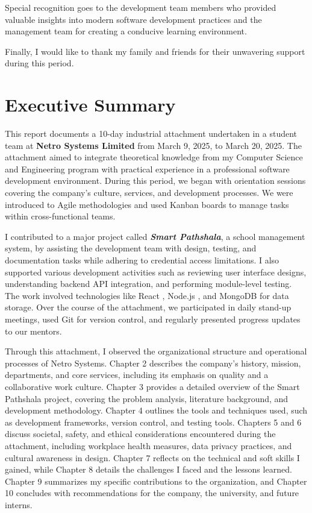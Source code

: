\documentclass[12pt,a4paper]{report}
\let\oldcite\cite
\renewcommand{\cite}[1]{\textcolor{impactcolor}{\oldcite{#1}}}
\begin{document}
Special recognition goes to the development team members who provided valuable insights into modern software development practices and the management team for creating a conducive learning environment.

Finally, I would like to thank my family and friends for their unwavering support during this period.

\chapter*{\textcolor{primaryblue}{Executive Summary}}

This report documents a 10-day industrial attachment undertaken in a student team at \textcolor{companycolor}{\textbf{Netro Systems Limited}} from March 9, 2025, to March 20, 2025. The attachment aimed to integrate theoretical knowledge from my Computer Science and Engineering program with practical experience in a professional software development environment. During this period, we began with orientation sessions covering the company’s culture, services, and development processes. We were introduced to Agile \cite{ref8} methodologies and used Kanban boards to manage tasks within cross-functional teams. 

I contributed to a major project called \textcolor{projectcolor}{\textbf{\textit{Smart Pathshala}}}, a school management system, by assisting the development team with design, testing, and documentation tasks while adhering to credential access limitations. I also supported various development activities such as reviewing user interface designs, understanding backend API integration, and performing module-level testing. The work involved technologies like React \cite{ref3}, Node.js \cite{ref5}, and MongoDB for data storage. Over the course of the attachment, we participated in daily stand-up meetings, used Git for version control, and regularly presented progress updates to our mentors.


Through this attachment, I observed the organizational structure and operational processes of Netro Systems. Chapter 2 describes the company's history, mission, departments, and core services, including its emphasis on quality and a collaborative work culture. Chapter 3 provides a detailed overview of the Smart Pathshala project, covering the problem analysis, literature background, and development methodology. Chapter 4 outlines the tools and techniques used, such as development frameworks, version control, and testing tools. Chapters 5 and 6 discuss societal, safety, and ethical considerations encountered during the attachment, including workplace health measures, data privacy practices, and cultural awareness in design. Chapter 7 reflects on the technical and soft skills I gained, while Chapter 8 details the challenges I faced and the lessons learned. Chapter 9 summarizes my specific contributions to the organization, and Chapter 10 concludes with recommendations for the company, the university, and future interns.
\end{document}
